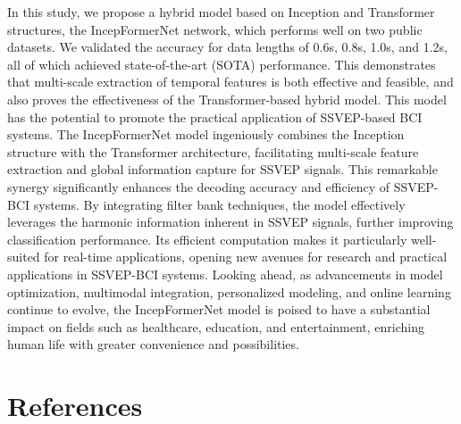 \documentclass[10pt]{iopart}
\begin{document}
In this study, we propose a hybrid model based on Inception and Transformer structures, the IncepFormerNet network, which performs well on two public datasets. We validated the accuracy for data lengths of 0.6s, 0.8s, 1.0s, and 1.2s, all of which achieved state-of-the-art (SOTA) performance. This demonstrates that multi-scale extraction of temporal features is both effective and feasible, and also proves the effectiveness of the Transformer-based hybrid model. This model has the potential to promote the practical application of SSVEP-based BCI systems. The IncepFormerNet model ingeniously combines the Inception structure with the Transformer architecture, facilitating multi-scale feature extraction and global information capture for SSVEP signals. This remarkable synergy significantly enhances the decoding accuracy and efficiency of SSVEP-BCI systems. By integrating filter bank techniques, the model effectively leverages the harmonic information inherent in SSVEP signals, further improving classification performance. Its efficient computation makes it particularly well-suited for real-time applications, opening new avenues for research and practical applications in SSVEP-BCI systems. Looking ahead, as advancements in model optimization, multimodal integration, personalized modeling, and online learning continue to evolve, the IncepFormerNet model is poised to have a substantial impact on fields such as healthcare, education, and entertainment, enriching human life with greater convenience and possibilities.
\section*{References}


\end{document}
